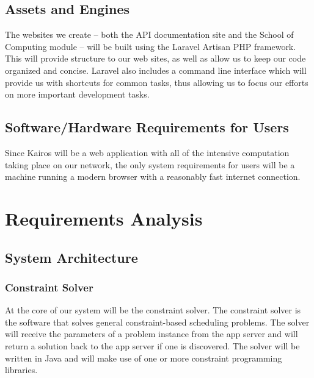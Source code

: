 \documentclass{extarticle}
\begin{document}
\subsection{Assets and Engines}
The websites we create -- both the API documentation site and the School of Computing module -- will be built using
the Laravel Artisan PHP framework.  This will provide structure to our web sites, as well as allow us to keep our
code organized and concise.  Laravel also includes a command line interface which will provide us with shortcuts
for common tasks, thus allowing us to focus our efforts on more important development tasks.

\subsection{Software/Hardware Requirements for Users}
Since Kairos will be a web application with all of the intensive computation taking place on our network, the only
system requirements for users will be a machine running a modern browser with a reasonably fast internet connection.

\section{Requirements Analysis}

\subsection{System Architecture}

\subsubsection{Constraint Solver}
At the core of our system will be the constraint solver.  The constraint solver is the software that solves general
constraint-based scheduling problems.  The solver will receive the parameters of a problem instance from the app
server and will return a solution back to the app server if one is discovered.  The solver will be written in Java
and will make use of one or more constraint programming libraries.
\end{document}
